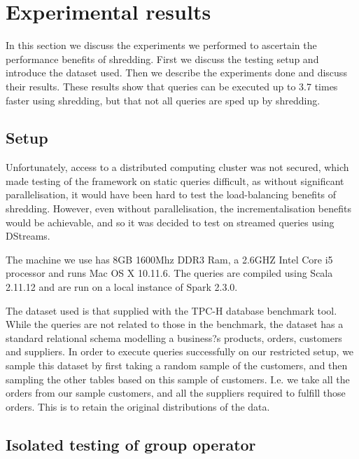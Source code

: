 \chapter{Experimental results} \label{results}

In this section we discuss the experiments we performed to ascertain the performance benefits of shredding. First we discuss the testing setup and introduce the dataset used. Then we describe the experiments done and discuss their results. These results show that queries can be executed up to 3.7 times faster using shredding, but that not all queries are sped up by shredding.

\section{Setup}

Unfortunately, access to a distributed computing cluster was not secured, which made testing of the framework on static queries difficult, as without significant parallelisation, it would have been hard to test the load-balancing benefits of shredding. However, even without parallelisation, the incrementalisation benefits would be achievable, and so it was decided to test on streamed queries using DStreams.

The machine we use has 8GB 1600Mhz DDR3 Ram, a 2.6GHZ Intel Core i5 processor and runs Mac OS X 10.11.6. The queries are compiled using Scala 2.11.12 and are run on a local instance of Spark 2.3.0. 

The dataset used is that supplied with the TPC-H \cite{tpch} database benchmark tool. While the queries are not related to those in the benchmark, the dataset has a standard relational schema modelling a business?s products, orders, customers and suppliers. In order to execute queries successfully on our restricted setup, we sample this dataset by first taking a random sample of the customers, and then sampling the other tables based on this sample of customers. I.e. we take all the orders from our sample customers, and all the suppliers required to fulfill those orders. This is to retain the original distributions of the data.

\section{Isolated testing of group operator}

